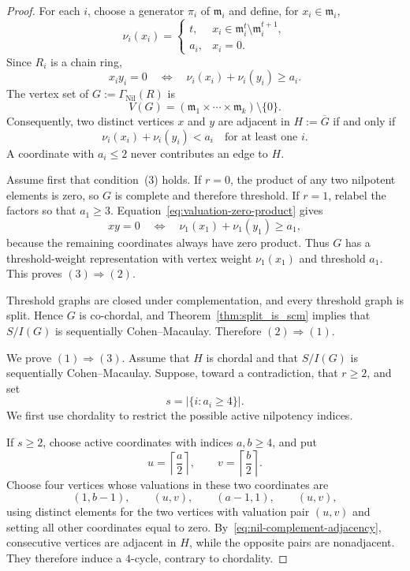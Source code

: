 \documentclass[12pt, reqno]{amsart}
\theoremstyle{definition}
\numberwithin{equation}{section}
\begin{document}
\begin{proof}
For each $i$, choose a generator $\pi_i$ of $\mathfrak m_i$ and define, for $x_i\in\mathfrak m_i$,
\[
\nu_i(x_i)=
\begin{cases}
t,&x_i\in\mathfrak m_i^t\setminus\mathfrak m_i^{t+1},\\
a_i,&x_i=0.
\end{cases}
\]
Since $R_i$ is a chain ring,
\begin{equation}\label{eq:valuation-zero-product}
x_iy_i=0
\quad\Longleftrightarrow\quad
\nu_i(x_i)+\nu_i(y_i)\ge a_i.
\end{equation}
The vertex set of $G:=\Gamma_{\operatorname{Nil}}(R)$ is
\[
V(G)=\left(\mathfrak m_1\times\cdots\times\mathfrak m_k\right)\setminus\{0\}.
\]
Consequently, two distinct vertices $x$ and $y$ are adjacent in $H:=\overline G$ if and only if
\begin{equation}\label{eq:nil-complement-adjacency}
\nu_i(x_i)+\nu_i(y_i)<a_i
\quad\text{for at least one }i.
\end{equation}
A coordinate with $a_i\le2$ never contributes an edge to $H$.

Assume first that condition~(3) holds.  If $r=0$, the product of any two nilpotent elements is zero, so $G$ is complete and therefore threshold.  If $r=1$, relabel the factors so that $a_1\ge3$.  Equation~\eqref{eq:valuation-zero-product} gives
\[
xy=0
\quad\Longleftrightarrow\quad
\nu_1(x_1)+\nu_1(y_1)\ge a_1,
\]
because the remaining coordinates always have zero product.  Thus $G$ has a threshold-weight representation with vertex weight $\nu_1(x_1)$ and threshold $a_1$.  This proves $(3)\Rightarrow(2)$.

Threshold graphs are closed under complementation, and every threshold graph is split.  Hence $G$ is co-chordal, and Theorem~\ref{thm:split_is_scm} implies that $S/I(G)$ is sequentially Cohen--Macaulay.  Therefore $(2)\Rightarrow(1)$.

We prove $(1)\Rightarrow(3)$.  Assume that $H$ is chordal and that $S/I(G)$ is sequentially Cohen--Macaulay.  Suppose, toward a contradiction, that $r\ge2$, and set
\[
s=\bigl|\{i:a_i\ge4\}\bigr|.
\]
We first use chordality to restrict the possible active nilpotency indices.

If $s\ge2$, choose active coordinates with indices $a,b\ge4$, and put
\[
u=\left\lceil\frac a2\right\rceil,
\qquad
v=\left\lceil\frac b2\right\rceil.
\]
Choose four vertices whose valuations in these two coordinates are
\[
(1,b-1),\qquad (u,v),\qquad (a-1,1),\qquad (u,v),
\]
using distinct elements for the two vertices with valuation pair $(u,v)$ and setting all other coordinates equal to zero.  By~\eqref{eq:nil-complement-adjacency}, consecutive vertices are adjacent in $H$, while the opposite pairs are nonadjacent.  They therefore induce a $4$-cycle, contrary to chordality.


\end{proof}
\end{document}
